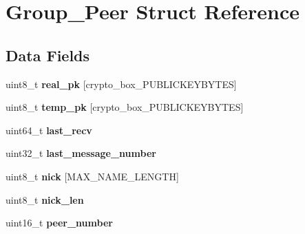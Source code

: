 \hypertarget{struct_group___peer}{\section{Group\+\_\+\+Peer Struct Reference}
\label{struct_group___peer}
}
\subsection*{Data Fields}
\begin{DoxyCompactItemize}
\item 
\hypertarget{struct_group___peer_ab42b4c90d81ac99b968c3edd1e21d706}{uint8\+\_\+t {\bfseries real\+\_\+pk} \mbox{[}crypto\+\_\+box\+\_\+\+P\+U\+B\+L\+I\+C\+K\+E\+Y\+B\+Y\+T\+E\+S\mbox{]}}\label{struct_group___peer_ab42b4c90d81ac99b968c3edd1e21d706}

\item 
\hypertarget{struct_group___peer_a46affbcc202b25e96fd1f5238e9e97e0}{uint8\+\_\+t {\bfseries temp\+\_\+pk} \mbox{[}crypto\+\_\+box\+\_\+\+P\+U\+B\+L\+I\+C\+K\+E\+Y\+B\+Y\+T\+E\+S\mbox{]}}\label{struct_group___peer_a46affbcc202b25e96fd1f5238e9e97e0}

\item 
\hypertarget{struct_group___peer_a03706feea89530a7ac78082fc79ed8fc}{uint64\+\_\+t {\bfseries last\+\_\+recv}}\label{struct_group___peer_a03706feea89530a7ac78082fc79ed8fc}

\item 
\hypertarget{struct_group___peer_a1a221b969812bb7c384b0eb23fb1012d}{uint32\+\_\+t {\bfseries last\+\_\+message\+\_\+number}}\label{struct_group___peer_a1a221b969812bb7c384b0eb23fb1012d}

\item 
\hypertarget{struct_group___peer_ae7cf3fd18e321fab5a711e72622301b9}{uint8\+\_\+t {\bfseries nick} \mbox{[}M\+A\+X\+\_\+\+N\+A\+M\+E\+\_\+\+L\+E\+N\+G\+T\+H\mbox{]}}\label{struct_group___peer_ae7cf3fd18e321fab5a711e72622301b9}

\item 
\hypertarget{struct_group___peer_aa316280abcd8913a502b56397dd13e23}{uint8\+\_\+t {\bfseries nick\+\_\+len}}\label{struct_group___peer_aa316280abcd8913a502b56397dd13e23}

\item 
\hypertarget{struct_group___peer_a264348ec1f724e05464ca97b7c432817}{uint16\+\_\+t {\bfseries peer\+\_\+number}}\label{struct_group___peer_a264348ec1f724e05464ca97b7c432817}


\end{DoxyCompactItemize}
